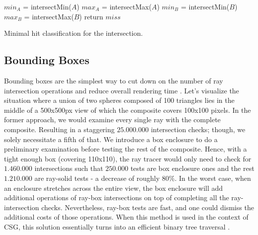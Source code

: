 \documentclass[a4paper,11pt,oneside]{article}
\begin{document}
\begin{algorithm}
	\SetAlgoLined
	$min_A$ = intersectMin($A$)\;
	$max_A$ = intersectMax($A$)\;
	$min_B$ = intersectMin($B$)\;
	$max_B$ = intersectMax($B$)\;
	return $miss$\;
	\caption{Minimal hit classification for the intersection.}
	\label{sec3.4:difference_algo}
\end{algorithm} 


\subsection{Bounding Boxes}
\label{section:bounding-boxes-optimization}

Bounding boxes are the simplest way to cut down on the number of ray intersection operations and reduce overall rendering time \cite{efficient_csg_meshes}. Let's visualize the situation where a union of two spheres composed of 100 triangles lies in the middle of a 500x500px view of which the composite covers 100x100 pixels. In the former approach, we would examine every single ray with the complete composite. Resulting in a staggering $25.000.000$ intersection checks; though,  we solely necessitate a fifth of that. We introduce a box enclosure to do a preliminary examination before testing the rest of the composite. Hence, with a tight enough box (covering 110x110), the ray tracer would only need to check for $1.460.000$ intersections such that $250.000$ tests are box enclosure ones and the rest $1.210.000$ are ray-solid tests - a decrease of roughly $80\%$. In the worst case, when an enclosure stretches across the entire view, the box enclosure will add additional operations of ray-box intersections on top of completing all the ray-intersection checks. Nevertheless, ray-box tests are fast, and one could dismiss the additional costs of those operations. When this method is used in the context of CSG, this solution essentially turns into an efficient binary tree traversal \cite{ROTH1982109}. 
\end{document}
